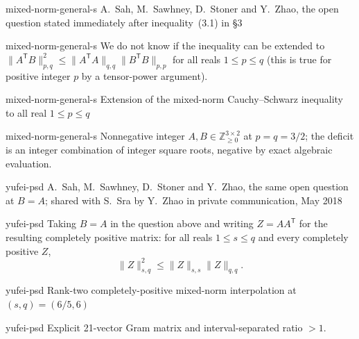 
\begin{cxsource}{mixed-norm-general-s}
A.~Sah, M.~Sawhney, D.~Stoner and Y.~Zhao, the open question stated immediately after inequality~(3.1) in \S3
\end{cxsource}

\begin{cxstatement}{mixed-norm-general-s}
We do not know if the inequality can be extended to $\|A^{\mathsf T}B\|_{{p,q}}^2\le\|A^{\mathsf T}A\|_{{q,q}}\|B^{\mathsf T}B\|_{{p,p}}$ for all reals $1\le p\le q$ (this is true for positive integer $p$ by a tensor-power argument).
\end{cxstatement}

\begin{cxsummary}{mixed-norm-general-s}
Extension of the mixed-norm Cauchy--Schwarz inequality to all real $1\le p\le q$ \citep{SahSawhneyStonerZhao2020}
\end{cxsummary}

\begin{cxcertificate}{mixed-norm-general-s}
Nonnegative integer $A,B\in\mathbb Z_{\ge0}^{3\times2}$ at $p=q=3/2$; the deficit is an integer combination of integer square roots, negative by exact algebraic evaluation.
\end{cxcertificate}


\begin{cxsource}{yufei-psd}
A.~Sah, M.~Sawhney, D.~Stoner and Y.~Zhao, the same open question at $B=A$; shared with S.~Sra by Y.~Zhao in private communication, May 2018
\end{cxsource}

\begin{cxstatement}{yufei-psd}
Taking $B=A$ in the question above and writing $Z=AA^{\mathsf T}$ for the resulting completely positive matrix: for all reals $1\le s\le q$ and every completely positive $Z$,
\[\|Z\|_{s,q}^2\le\|Z\|_{s,s}\|Z\|_{q,q}.\]
\end{cxstatement}

\begin{cxsummary}{yufei-psd}
Rank-two completely-positive mixed-norm interpolation at $(s,q)=(6/5,6)$
\end{cxsummary}

\begin{cxcertificate}{yufei-psd}
Explicit 21-vector Gram matrix and interval-separated ratio $>1$.
\end{cxcertificate}


